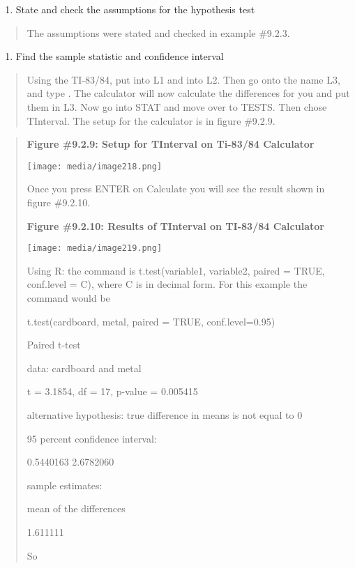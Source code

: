 \documentclass[]{book}
\providecommand{\tightlist}{%
  \setlength{\itemsep}{0pt}\setlength{\parskip}{0pt}}
\begin{document}
\begin{enumerate}
\def\labelenumi{\arabic{enumi}.}
\setcounter{enumi}{1}
\tightlist
\item
  State and check the assumptions for the hypothesis test
\end{enumerate}

\begin{quote}
The assumptions were stated and checked in example \#9.2.3.
\end{quote}

\begin{enumerate}
\def\labelenumi{\arabic{enumi}.}
\setcounter{enumi}{2}
\tightlist
\item
  Find the sample statistic and confidence interval
\end{enumerate}

\begin{quote}
Using the TI-83/84, put into L1 and into L2. Then go onto the name L3, and type . The calculator will now calculate the differences for you and put them in L3. Now go into STAT and move over to TESTS. Then chose TInterval. The setup for the calculator is in figure \#9.2.9.
\end{quote}

\begin{quote}
\textbf{Figure \#9.2.9: Setup for TInterval on Ti-83/84 Calculator}

\texttt{[image: media/image218.png]}

Once you press ENTER on Calculate you will see the result shown in
figure \#9.2.10.

\textbf{Figure \#9.2.10: Results of TInterval on TI-83/84 Calculator}

\texttt{[image: media/image219.png]}

Using R: the command is t.test(variable1, variable2, paired = TRUE, conf.level = C), where C is in decimal form. For this example the command would be

t.test(cardboard, metal, paired = TRUE, conf.level=0.95)

Paired t-test

data: cardboard and metal

t = 3.1854, df = 17, p-value = 0.005415

alternative hypothesis: true difference in means is not equal to 0

95 percent confidence interval:

0.5440163 2.6782060

sample estimates:

mean of the differences

1.611111

So
\end{quote}
\end{document}
